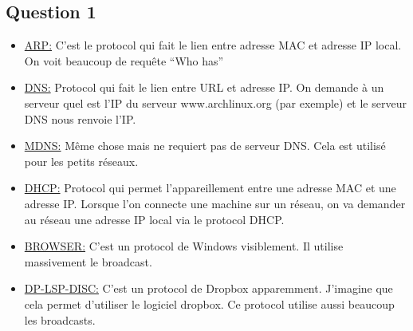 \documentclass[10,a4paper]{article}
\begin{document}
\subsection*{Question 1}
\begin{itemize}
\item \underline{ARP:} C'est le protocol qui fait le lien entre adresse MAC et adresse IP local. On voit beaucoup de requête ``Who has''
\item \underline{DNS:} Protocol qui fait le lien entre URL et adresse IP. On demande à un serveur quel est l'IP du serveur www.archlinux.org (par exemple) et le serveur DNS nous renvoie l'IP.
\item \underline{MDNS:} Même chose mais ne requiert pas de serveur DNS. Cela est utilisé pour les petits réseaux.
\item \underline{DHCP:} Protocol qui permet l'appareillement entre une adresse MAC et une adresse IP. Lorsque l'on connecte une machine sur un réseau, on va demander au réseau une adresse IP local via le protocol DHCP.
\item \underline{BROWSER:} C'est un protocol de Windows visiblement. Il utilise massivement le broadcast.
\item \underline{DP-LSP-DISC:} C'est un protocol de Dropbox apparemment. J'imagine que cela permet d'utiliser le logiciel dropbox. Ce protocol utilise aussi beaucoup les broadcasts.
\end{itemize}
\end{document}
